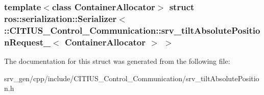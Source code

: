 \subsubsection*{template$<$class Container\-Allocator$>$ struct ros\-::serialization\-::\-Serializer$<$ \-::\-C\-I\-T\-I\-U\-S\-\_\-\-Control\-\_\-\-Communication\-::srv\-\_\-tilt\-Absolute\-Position\-Request\-\_\-$<$ Container\-Allocator $>$ $>$}



\-The documentation for this struct was generated from the following file\-:\begin{DoxyCompactItemize}
\item 
srv\-\_\-gen/cpp/include/\-C\-I\-T\-I\-U\-S\-\_\-\-Control\-\_\-\-Communication/srv\-\_\-tilt\-Absolute\-Position.\-h\end{DoxyCompactItemize}
